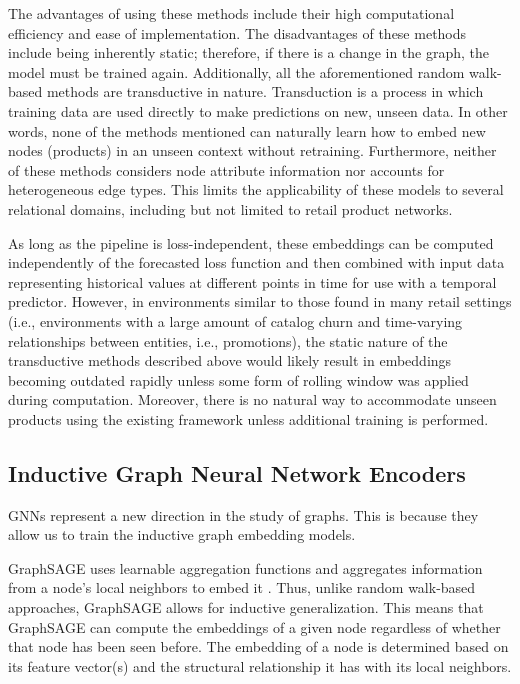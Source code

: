 The advantages of using these methods include their high computational efficiency and ease of implementation. The disadvantages of these methods include being inherently static; therefore, if there is a change in the graph, the model must be trained again. Additionally, all the aforementioned random walk-based methods are transductive in nature. Transduction is a process in which training data are used directly to make predictions on new, unseen data. In other words, none of the methods mentioned can naturally learn how to embed new nodes (products) in an unseen context without retraining. Furthermore, neither of these methods considers node attribute information nor accounts for heterogeneous edge types. This limits the applicability of these models to several relational domains, including but not limited to retail product networks.

As long as the pipeline is loss-independent, these embeddings can be computed independently of the forecasted loss function and then combined with input data representing historical values at different points in time for use with a temporal predictor. However, in environments similar to those found in many retail settings (i.e., environments with a large amount of catalog churn and time-varying relationships between entities, i.e., promotions), the static nature of the transductive methods described above would likely result in embeddings becoming outdated rapidly unless some form of rolling window was applied during computation. Moreover, there is no natural way to accommodate unseen products using the existing framework unless additional training is performed.

\subsection{Inductive Graph Neural Network Encoders}

GNNs represent a new direction in the study of graphs. This is because they allow us to train the inductive graph embedding models.

GraphSAGE uses learnable aggregation functions and aggregates information from a node's local neighbors to embed it \cite{hamilton2017graphsage}. Thus, unlike random walk-based approaches, GraphSAGE allows for inductive generalization. This means that GraphSAGE can compute the embeddings of a given node regardless of whether that node has been seen before. The embedding of a node is determined based on its feature vector(s) and the structural relationship it has with its local neighbors.

